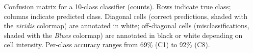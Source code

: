 \caption{Confusion matrix for a 10-class classifier (counts). Rows indicate true class; columns indicate predicted class. Diagonal cells (correct predictions, shaded with the \textit{viridis} colormap) are annotated in white; off-diagonal cells (misclassifications, shaded with the \textit{Blues} colormap) are annotated in black or white depending on cell intensity. Per-class accuracy ranges from 69\% (C1) to 92\% (C8).}
